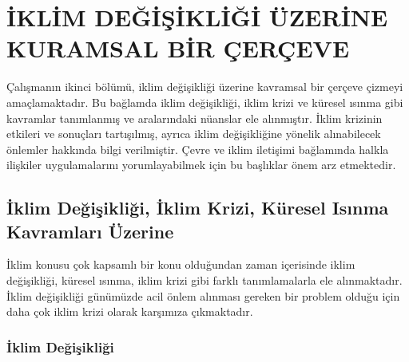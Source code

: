 \documentclass[
]{book}
\begin{document}
\hypertarget{iklim-deux11fiux15fikliux11fi-uxfczerine-kuramsal-bir-uxe7eruxe7eve}{%
\chapter{İKLİM DEĞİŞİKLİĞİ ÜZERİNE KURAMSAL BİR ÇERÇEVE}\label{iklim-deux11fiux15fikliux11fi-uxfczerine-kuramsal-bir-uxe7eruxe7eve}}

Çalışmanın ikinci bölümü, iklim değişikliği üzerine kavramsal bir çerçeve çizmeyi amaçlamaktadır. Bu bağlamda iklim değişikliği, iklim krizi ve küresel ısınma gibi kavramlar tanımlanmış ve aralarındaki nüanslar ele alınmıştır. İklim krizinin etkileri ve sonuçları tartışılmış, ayrıca iklim değişikliğine yönelik alınabilecek önlemler hakkında bilgi verilmiştir. Çevre ve iklim iletişimi bağlamında halkla ilişkiler uygulamalarını yorumlayabilmek için bu başlıklar önem arz etmektedir.

\hypertarget{iklim-deux11fiux15fikliux11fi-iklim-krizi-kuxfcresel-isux131nma-kavramlarux131-uxfczerine}{%
\section{İklim Değişikliği, İklim Krizi, Küresel Isınma Kavramları Üzerine}\label{iklim-deux11fiux15fikliux11fi-iklim-krizi-kuxfcresel-isux131nma-kavramlarux131-uxfczerine}}

İklim konusu çok kapsamlı bir konu olduğundan zaman içerisinde iklim değişikliği, küresel ısınma, iklim krizi gibi farklı tanımlamalarla ele alınmaktadır. İklim değişikliği günümüzde acil önlem alınması gereken bir problem olduğu için daha çok iklim krizi olarak karşımıza çıkmaktadır.

\hypertarget{iklim-deux11fiux15fikliux11fi}{%
\subsection{İklim Değişikliği}\label{iklim-deux11fiux15fikliux11fi}}
\end{document}
